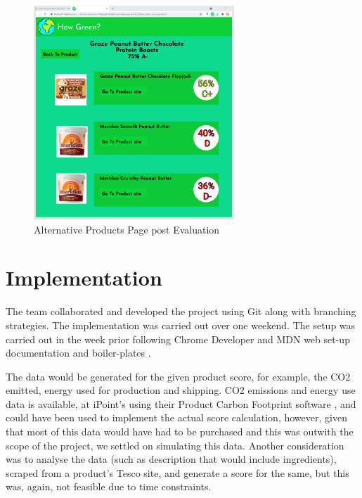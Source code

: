 \documentclass[a4,10pt,twocolumn]{article}
\begin{document}
\begin{figure}[h]
    \centering
    \includegraphics[width=0.75\columnwidth]{assets/prototype/post_eval.PNG}
    \caption{Alternative Products Page post Evaluation}
\end{figure}


\section*{Implementation}

\par The team collaborated and developed the project using Git along with branching strategies. %
The implementation was carried out over one weekend. The setup was carried out in the week prior following Chrome Developer and MDN web set-up documentation \cite{MDN,ChromeExt} and boiler-plates \cite{fregante,gtalarico,sivertschou}. 

\par The data would be generated for the given product score, for example, the CO2 emitted, energy used for production and shipping.
CO2 emissions and energy use data is available, at iPoint's using their Product Carbon Footprint software \cite{PCF}, and could have been used to implement the actual score calculation, however, given that most of this data would have had to be purchased and this was outwith the scope of the project, we settled on simulating this data. Another consideration was to analyse the data (such as description that would include ingredients), scraped from a product's Tesco site, and generate a score for the same, but this was, again, not feasible due to time constraints. 
\end{document}
